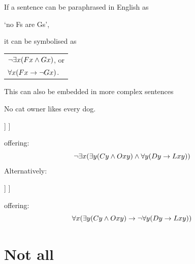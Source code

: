 	
	\begin{highlighted}
		If a sentence can be paraphrased in English as \begin{center}
			`no Fs are Gs',
		\end{center} it can be symbolised as  \begin{center}
			\begin{tabular}{l}$\neg \exists x (Fx \mathbin{\wedge} Gx)$, or \\$\forall x(Fx\rightarrow\neg Gx)$.
			\end{tabular}
		\end{center}
	\end{highlighted}
	
	This can also be embedded in more complex sentences
	\begin{samplesent}
		\item No cat owner likes every dog.
	\end{samplesent}

	\begin{center}
	\begin{forest}
		[No cat owner likes every dog.\\It is not the case that there exists some $x$ which \ldots and \ldots\\
		$\enot\exists x(\ldots\eand\ldots)$
		[$x$ is a cat owner\\ $x$ owns a cat\\$\exists y(Cy\eand Oxy)$]
		[$x$ likes every dog\\$\forall y(Dy\eif Lxy)$]]
		]
	\end{forest}
\end{center}offering:
	$$\neg \exists x(\exists y(Cy\mathbin{\wedge} Oxy)\mathbin{\wedge}\forall y(Dy\rightarrow Lxy))$$
	Alternatively:
	\begin{center}
		\begin{forest}
			[No cat owner likes every dog.\\For all $x$: if \ldots then not \ldots\\
			$\forall x(\ldots\eif\enot\ldots)$
			[$x$ is a cat owner\\$\exists y(Cy\eand Oxy)$]
			[$x$ likes every dog\\$\forall y(Dy\eif Lxy)$]]
			]
		\end{forest}
	\end{center}
	offering: $$\forall x(\exists y(Cy\mathbin{\wedge} Oxy)\rightarrow \neg\forall y(Dy\rightarrow Lxy))$$


	
		\section{Not all}
		
